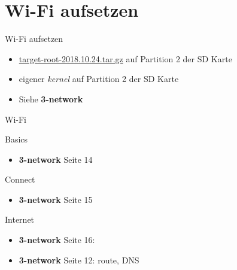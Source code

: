 \section{Wi-Fi aufsetzen}
\begin{frame}{Wi-Fi aufsetzen}
 \begin{itemize}
  \item \href{https://drive.switch.ch/index.php/s/b6kZ5n2TOIDzEiv}
        {target-root-2018.10.24.tar.gz}
        auf Partition 2 der SD Karte
  \item eigener {\em kernel} auf Partition 2 der SD Karte 
  \item Siehe {\bf 3-network} 
 \end{itemize}
\end{frame}

\begin{frame}{Wi-Fi}
 \begin{block}{Basics}
  \begin{itemize}
   \item {\bf 3-network} Seite 14
  \end{itemize}
  \end{block}
  \begin{block}{Connect}
   \begin{itemize}
    \item {\bf 3-network} Seite 15
   \end{itemize}
 \end{block}
 \begin{block}{Internet}
  \begin{itemize}
   \item {\bf 3-network} Seite 16: 
   \item {\bf 3-network} Seite 12: route, DNS
  \end{itemize}
 \end{block}
\end{frame}

